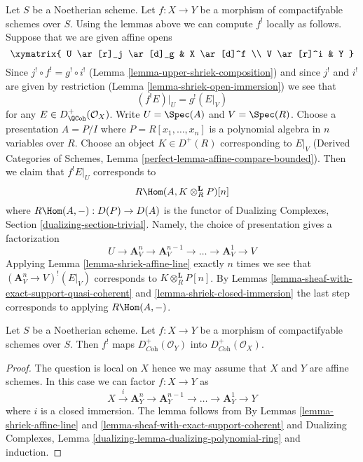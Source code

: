 \begin{remark}
\label{remark-local-calculation-shriek}
Let $S$ be a Noetherian scheme. Let $f : X \to Y$ be a morphism of
compactifyable schemes over $S$. Using the lemmas above we can compute
$f^!$ locally as follows. Suppose that we are given affine opens
$$
\xymatrix{
U \ar[r]_j \ar[d]_g & X \ar[d]^f \\
V \ar[r]^i & Y
}
$$
Since $j^! \circ f^! = g^! \circ i^!$
(Lemma \ref{lemma-upper-shriek-composition})
and since $j^!$ and $i^!$ are given by restriction
(Lemma \ref{lemma-shriek-open-immersion})
we see that
$$
(f^!E)|_U = g^!(E|_V)
$$
for any $E \in D^+_\QCoh(\mathcal{O}_X)$. Write
$U = \Spec(A)$ and $V = \Spec(R)$.
Choose a presentation $A = P/I$ where $P = R[x_1, \ldots, x_n]$
is a polynomial algebra in $n$ variables over $R$. Choose an
object $K \in D^+(R)$ corresponding to $E|_V$
(Derived Categories of Schemes, Lemma
\ref{perfect-lemma-affine-compare-bounded}).
Then we claim that $f^!E|_U$ corresponds to
$$
R\Hom(A, K \otimes_R^\mathbf{L} P)[n]
$$
where $R\Hom(A, -) : D(P) \to D(A)$ is the functor of
Dualizing Complexes, Section \ref{dualizing-section-trivial}.
Namely, the choice of presentation
gives a factorization
$$
U \rightarrow \mathbf{A}^n_V \to \mathbf{A}^{n - 1}_V \to \ldots \to
\mathbf{A}^1_V \to V
$$
Applying Lemma \ref{lemma-shriek-affine-line} exactly $n$ times we see that
$(\mathbf{A}^n_V \to V)^!(E|_V)$ corresponds to
$K \otimes_R^\mathbf{L} P[n]$. By Lemmas
\ref{lemma-sheaf-with-exact-support-quasi-coherent} and
\ref{lemma-shriek-closed-immersion} the last step corresponds to
applying $R\Hom(A, -)$.
\end{remark}

\begin{lemma}
\label{lemma-shriek-coherent}
Let $S$ be a Noetherian scheme. Let $f : X \to Y$ be a morphism
of compactifyable schemes over $S$. Then $f^!$ maps
$D_{\textit{Coh}}^+(\mathcal{O}_Y)$ into $D_{\textit{Coh}}^+(\mathcal{O}_X)$.
\end{lemma}

\begin{proof}
The question is local on $X$ hence we may assume that $X$ and $Y$ are
affine schemes. In this case we can factor $f : X \to Y$ as
$$
X \xrightarrow{i} \mathbf{A}^n_Y \to \mathbf{A}^{n - 1}_Y \to \ldots \to
\mathbf{A}^1_Y \to Y
$$
where $i$ is a closed immersion. The lemma follows from
By Lemmas \ref{lemma-shriek-affine-line} and
\ref{lemma-sheaf-with-exact-support-coherent} and
Dualizing Complexes, Lemma
\ref{dualizing-lemma-dualizing-polynomial-ring}
and induction.
\end{proof}


